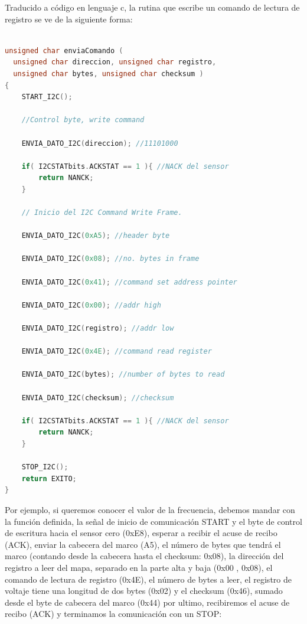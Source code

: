 Traducido a código en lenguaje c, la rutina que escribe un comando de lectura de registro se ve de la siguiente forma:

\begin{lstlisting}[language=C]

unsigned char enviaComando ( 
  unsigned char direccion, unsigned char registro, 
  unsigned char bytes, unsigned char checksum )
{
    START_I2C();
 
    //Control byte, write command
    
    ENVIA_DATO_I2C(direccion); //11101000   
    
    if( I2CSTATbits.ACKSTAT == 1 ){ //NACK del sensor
        return NANCK;
    }

    // Inicio del I2C Command Write Frame.
    
    ENVIA_DATO_I2C(0xA5); //header byte
        
    ENVIA_DATO_I2C(0x08); //no. bytes in frame
    
    ENVIA_DATO_I2C(0x41); //command set address pointer
   
    ENVIA_DATO_I2C(0x00); //addr high
     
    ENVIA_DATO_I2C(registro); //addr low 

    ENVIA_DATO_I2C(0x4E); //command read register
    
    ENVIA_DATO_I2C(bytes); //number of bytes to read 
    
    ENVIA_DATO_I2C(checksum); //checksum   
   
    if( I2CSTATbits.ACKSTAT == 1 ){ //NACK del sensor
        return NANCK;
    }
          
    STOP_I2C();
    return EXITO;
}

\end{lstlisting}

Por ejemplo, si queremos conocer el valor de la frecuencia, debemos mandar con la función definida, la señal de inicio de comunicación START y el byte de control de escritura hacia el sensor cero (0xE8), esperar a recibir el acuse de recibo (ACK), enviar la cabecera del marco (A5), el número de bytes que tendrá el marco (contando desde la cabecera hasta el checksum: 0x08), la dirección del registro a leer del mapa, separado en la parte alta y baja (0x00 , 0x08), el comando de lectura de registro (0x4E), el número de bytes a leer, el registro de voltaje tiene una longitud de dos bytes (0x02) y el checksum (0x46), sumado desde el byte de cabecera del marco (0x44) por ultimo, recibiremos el acuse de recibo (ACK) y terminamos la comunicación con un STOP:

